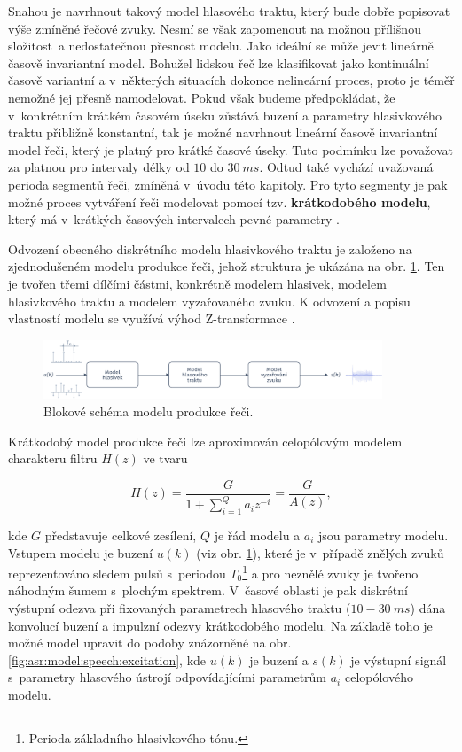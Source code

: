 Snahou je navrhnout takový model hlasového traktu, který bude dobře popisovat výše zmíněné řečové zvuky. Nesmí se však zapomenout na možnou přílišnou složitost~a nedostatečnou přesnost modelu. Jako ideální se může jevit lineárně časově invariantní model. Bohužel lidskou řeč lze klasifikovat jako kontinuální časově variantní a v~některých situacích dokonce nelineární proces, proto je téměř nemožné jej přesně namodelovat. Pokud však budeme předpokládat, že v~konkrétním krátkém časovém úseku zůstává buzení a parametry hlasivkového traktu přibližně konstantní, tak je možné navrhnout lineární časově invariantní model řeči, který je platný pro krátké časové úseky. Tuto podmínku lze považovat za platnou pro intervaly délky od $10$ do $30\ ms$. Odtud také vychází uvažovaná perioda segmentů řeči, zmíněná v~úvodu této kapitoly. Pro tyto segmenty je pak možné proces vytváření řeči modelovat pomocí tzv. \textbf{krátkodobého modelu}, který má v~krátkých časových intervalech pevné parametry \cite{Holmes2001}.

Odvození obecného diskrétního modelu hlasivkového traktu je založeno na zjednodušeném modelu produkce řeči, jehož struktura je ukázána na obr. \ref{fig:asr:model:speech}. Ten je tvořen třemi dílčími částmi, konkrétně modelem hlasivek, modelem hlasivkového traktu a modelem vyzařovaného zvuku. K odvození a popisu vlastností modelu se využívá výhod Z-transformace \cite{Psutka2006}.

\begin{figure}[hbpt]
  \centering
  \includegraphics[width=0.9\textwidth]{./ch4-asr/img/speech_model.pdf}
  \caption{Blokové schéma modelu produkce řeči.}
  \label{fig:asr:model:speech}
\end{figure}


Krátkodobý model produkce řeči lze aproximován celopólovým modelem charakteru filtru $H(z)$ ve tvaru

\begin{equation}
  H(z) = \frac{G}{1 + \sum_{i = 1}^{Q} a_{i} z^{-i}} = \frac{G}{A(z)},
  \label{eq:asr:lpc:generic}
\end{equation}

\noindent kde $G$ představuje celkové zesílení, $Q$ je řád modelu a $a_i$ jsou parametry modelu. Vstupem modelu je buzení $u(k)$ (viz obr. \ref{fig:asr:model:speech}), které je v~případě znělých zvuků reprezentováno sledem pulsů s~periodou $T_0$\footnote{Perioda základního hlasivkového tónu.} a pro neznělé zvuky je tvořeno náhodným šumem s~plochým spektrem. V~časové oblasti je pak diskrétní výstupní odezva při fixovaných parametrech hlasového traktu ($10 - 30\ ms$) dána konvolucí buzení a impulzní odezvy krátkodobého modelu. Na základě toho je možné model upravit do podoby znázorněné na obr. \ref{fig:asr:model:speech:excitation}, kde $u(k)$ je buzení a $s(k)$ je výstupní signál s~parametry hlasového ústrojí odpovídajícími parametrům $a_i$ celopólového modelu.

